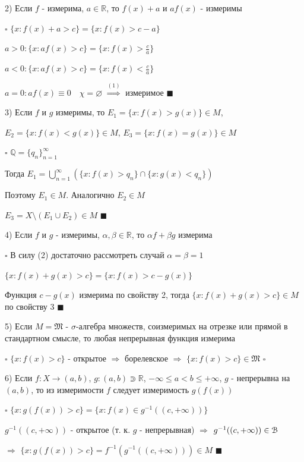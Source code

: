 \documentclass[a4paper]{report}
\begin{document}
2) Если $f$ - измерима, $a\in\mathbb R$, то $f(x)+a$ и $af(x)$ - измеримы

\noindent $\square$ $\{x\colon f(x)+a>c\}=\{x\colon f(x)>c-a\}$

$a>0\colon\{x\colon af(x)>c\}=\{x\colon f(x)>\frac{c}{a}\}$

$a<0\colon\{x\colon af(x)>c\}=\{x\colon f(x)<\frac{c}{a}\}$

$a=0\colon af(x)\equiv0\quad\chi=\varnothing$ $\stackrel{(1)}{\Rightarrow}$ измеримое $\blacksquare$
\bigskip

3) Если $f$ и $g$ измеримы, то $E_1=\{x\colon f(x)>g(x)\}\in M$, 

$E_2=\{x\colon f(x)<g(x)\}\in M$, $E_3=\{x\colon f(x)=g(x)\}\in M$

\noindent $\square$ $\mathbb Q=\{q_n\}_{n=1}^\infty$

Тогда $E_1=\bigcup\limits_{n=1}^\infty\left(\{x\colon f(x)>q_n\}\cap\{x\colon g(x)<q_n\}\right)$

Поэтому $E_1\in M$. Аналогично $E_2\in M$

$E_3=X\setminus(E_1\cup E_2)\in M$ $\blacksquare$
\bigskip

4) Если $f$ и $g$ - измеримы, $\alpha,\beta\in\mathbb R$, то $\alpha f+\beta g$ измерима

\noindent $\square$ В силу (2) достаточно рассмотреть случай $\alpha=\beta=1$

$\{x\colon f(x)+g(x)>c\}=\{x\colon f(x)>c-g(x)\}$

Функция $c-g(x)$ измерима по свойству 2, тогда $\{x\colon f(x)+g(x)>c\}\in M$ по свойству 3 $\blacksquare$
\bigskip

5) Если $M=\mathfrak M$ - $\sigma$-алгебра множеств, соизмеримых на отрезке или прямой в стандартном смысле, то любая непрерывная функция измерима

\noindent $\square$ $\{x\colon f(x)>c\}$ - открытое $\Rightarrow$ борелевское $\Rightarrow$ $\{x\colon f(x)>c\}\in\mathfrak M$ $\square$
\bigskip

6) Если $f\colon X\to(a,b)$, $g\colon(a,b)\Supset\mathbb R$, $-\infty\le a<b\le+\infty$, $g$ - непрерывна на $(a,b)$, то из измеримости $f$ следует измеримость $g(f(x))$

\noindent $\square$ $\{x\colon g(f(x))>c\}=\{x\colon f(x)\in g^{-1}((c,+\infty))\}$

$g^{-1}((c,+\infty))$ - открытое (т. к. $g$ - непрерывная) $\Rightarrow$ $g^{-1}((c,+\infty))\in\EuScript B$ 

$\Rightarrow$
$\{x\colon g(f(x))>c\}=f^{-1}\left(g^{-1}((c,+\infty))\right)\in M$ $\blacksquare$
\bigskip
\end{document}
